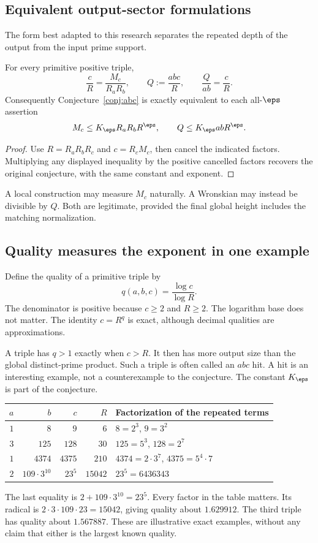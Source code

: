 \subsection{Equivalent output-sector formulations}
The form best adapted to this research separates the repeated depth of the output from the input prime support.
\begin{proposition}\label{prop:defect}
For every primitive positive triple,
\[
 \frac cR=\frac{M_c}{R_aR_b},\qquad
 Q:=\frac{abc}{R},\qquad \frac Q{ab}=\frac cR.
\]
Consequently Conjecture~\ref{conj:abc} is exactly equivalent to each all-$\eps$ assertion
\[
 M_c\le K_\eps R_aR_bR^\eps,
 \qquad Q\le K_\eps abR^\eps.
\]
\end{proposition}
\begin{proof}
Use $R=R_aR_bR_c$ and $c=R_cM_c$, then cancel the indicated factors. Multiplying any displayed inequality by the positive cancelled factors recovers the original conjecture, with the same constant and exponent.
\end{proof}
A local construction may measure $M_c$ naturally. A Wronskian may instead be divisible by $Q$. Both are legitimate, provided the final global height includes the matching normalization.

\subsection{Quality measures the exponent in one example}
Define the quality of a primitive triple by
\[
 q(a,b,c)=\frac{\log c}{\log R}.
\]
The denominator is positive because $c\ge2$ and $R\ge2$. The logarithm base does not matter. The identity $c=R^q$ is exact, although decimal qualities are approximations.

A triple has $q>1$ exactly when $c>R$. It then has more output size than the global distinct-prime product. Such a triple is often called an $abc$ hit. A hit is an interesting example, not a counterexample to the conjecture. The constant $K_\eps$ is part of the conjecture.

\begin{center}
\begin{tabular}{@{}rrrrl@{}}
\toprule
$a$&$b$&$c$&$R$&Factorization of the repeated terms\\
\midrule
$1$&$8$&$9$&$6$&$8=2^3$, $9=3^2$\\
$3$&$125$&$128$&$30$&$125=5^3$, $128=2^7$\\
$1$&$4374$&$4375$&$210$&$4374=2\cdot3^7$, $4375=5^4\cdot7$\\
$2$&$109\cdot3^{10}$&$23^5$&$15042$&$23^5=6436343$\\
\bottomrule
\end{tabular}
\end{center}
The last equality is $2+109\cdot3^{10}=23^5$. Every factor in the table matters. Its radical is $2\cdot3\cdot109\cdot23=15042$, giving quality about $1.629912$. The third triple has quality about $1.567887$. These are illustrative exact examples, without any claim that either is the largest known quality.

